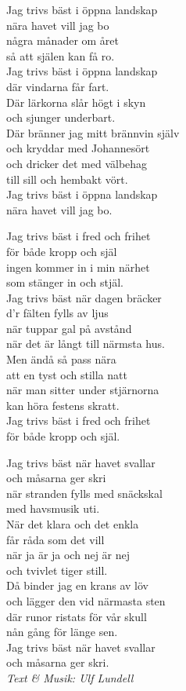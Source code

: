 \vspace{10pt}
Jag trivs bäst i öppna landskap\\
nära havet vill jag bo\\
några månader om året\\
så att själen kan få ro.\\
Jag trivs bäst i öppna landskap\\
där vindarna får fart.\\
Där lärkorna slår högt i skyn\\
och sjunger underbart.\\
Där bränner jag mitt brännvin själv\\
och kryddar med Johannesört\\
och dricker det med välbehag\\
till sill och hembakt vört.\\
Jag trivs bäst i öppna landskap\\
nära havet vill jag bo.\par
\vspace{10pt}
Jag trivs bäst i fred och frihet\\
för både kropp och själ\\
ingen kommer in i min närhet\\
som stänger in och stjäl.\\
Jag trivs bäst när dagen bräcker\\
d'r fälten fylls av ljus\\
när tuppar gal på avstånd\\
när det är långt till närmsta hus.\\
Men ändå så pass nära\\
att en tyst och stilla natt\\
när man sitter under stjärnorna\\
kan höra festens skratt.\\
Jag trivs bäst i fred och frihet\\
för både kropp och själ.\par
\vspace{10pt}
Jag trivs bäst när havet svallar\\
och måsarna ger skri\\
när stranden fylls med snäckskal\\
med havsmusik uti.\\
När det klara och det enkla\\
får råda som det vill\\
när ja är ja och nej är nej\\
och tvivlet tiger still.\\
Då binder jag en krans av löv\\
och lägger den vid närmasta sten\\
där runor ristats för vår skull\\
nån gång för länge sen.\\
Jag trivs bäst när havet svallar\\
och måsarna ger skri.\\
\vspace{10pt}
{\footnotesize\textit{Text \& Musik: Ulf Lundell}}
